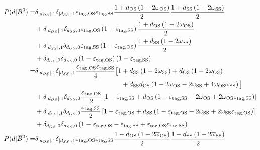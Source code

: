 \begin{align*}
    P(d|\Bz) =& \delta_{\left|d_{OS}\right|,1}\delta_{\left|d_{SS}\right|,1}\varepsilon_\text{tag,OS}\varepsilon_\text{tag,SS}
        \frac{1+d_\text{OS}\left(1-2\omega_\text{OS}\right)}{2}\frac{1+d_\text{SS}\left(1-2\omega_\text{SS}\right)}{2}\\
    &+\delta_{\left|d_{OS}\right|,1}\delta_{d_{SS},0}\varepsilon_\text{tag,OS}\left(1-\varepsilon_\text{tag,SS}\right)
        \frac{1+d_\text{OS}\left(1-2\omega_\text{OS}\right)}{2}\\
    &+\delta_{\left|d_{SS}\right|,1}\delta_{d_{OS},0}\varepsilon_\text{tag,SS}\left(1-\varepsilon_\text{tag,OS}\right)
    \frac{1+d_\text{SS}\left(1-2\omega_\text{SS}\right)}{2}\\
    &+\delta_{d_{OS},0}\delta_{d_{SS},0}\left(1-\varepsilon_\text{tag,OS}\right)\left(1-\varepsilon_\text{tag,SS}\right)\\
    =&\delta_{\left|d_{OS}\right|,1}\delta_{\left|d_{SS}\right|,1}\frac{\varepsilon_\text{tag,OS}\varepsilon_\text{tag,SS}}{4}\big[1+d_\text{SS}
        \left(1-2\omega_\text{SS}\right)+d_\text{OS}\left(1-2\omega_\text{OS}\right)\\
    &\hphantom{\delta_{\left|d_{OS}\right|,1}\delta_{\left|d_{SS}\right|,1}\frac{\varepsilon_\text{tag,OS}\varepsilon_\text{tag,SS}}{4}\big[1}
        +d_\text{SS}d_\text{OS}\left(1-2\omega_\text{OS}-2\omega_\text{SS}+4\omega_\text{OS}\omega_\text{SS}\right)\big]\\
    &+\delta_{\left|d_{OS}\right|,1}\delta_{d_{SS},0}\frac{\varepsilon_\text{tag,OS}}{2}\left[1-\varepsilon_\text{tag,SS}+d_\text{OS}
        \left(1-\varepsilon_\text{tag,SS}-2\omega_\text{OS}+2\omega_\text{OS}\varepsilon_\text{tag,SS}\right)\right]\\
    &+\delta_{\left|d_{SS}\right|,1}\delta_{d_{OS},0}\frac{\varepsilon_\text{tag,SS}}{2}\left[1-\varepsilon_\text{tag,OS}+d_\text{SS}
        \left(1-\varepsilon_\text{tag,OS}-2\omega_\text{SS}+2\omega_\text{SS}\varepsilon_\text{tag,OS}\right)\right]\\
    &+\delta_{d_{OS},0}\delta_{d_{SS},0}\left(1-\varepsilon_\text{tag,OS}-\varepsilon_\text{tag,SS}
        +\varepsilon_\text{tag,OS}\varepsilon_\text{tag,SS}\right)\\
    P(d|\Bzb) =& \delta_{\left|d_{OS}\right|,1}\delta_{\left|d_{SS}\right|,1}\overline{\varepsilon}_\text{tag,OS}\overline{\varepsilon}_\text{tag,SS}
        \frac{1-d_\text{OS}\left(1-2\overline{\omega}_\text{OS}\right)}{2}\frac{1-d_\text{SS}\left(1-2\overline{\omega}_\text{SS}\right)}{2}\\

\end{align*}
